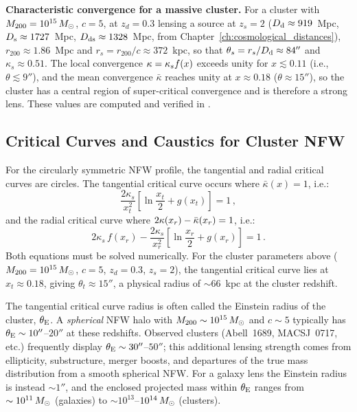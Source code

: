 \begin{example}
\textbf{Characteristic convergence for a massive cluster.}
For a cluster with $M_{200} = 10^{15}\,M_{\odot}$, $c = 5$, at
$z_d = 0.3$ lensing a source at $z_s = 2$
($D_{\mathrm{d}} \approx 919$~Mpc, $D_{\mathrm{s}} \approx 1727$~Mpc,
$D_{\mathrm{ds}} \approx 1328$~Mpc, from Chapter~\ref{ch:cosmological_distances}),
$r_{200} \approx 1.86$~Mpc and $r_s = r_{200}/c \approx 372$~kpc, so
that $\theta_s = r_s / D_{\mathrm{d}} \approx 84''$ and $\kappa_s \approx 0.51$.
The local convergence $\kappa = \kappa_s f(x)$ exceeds unity for
$x \lesssim 0.11$ (i.e., $\theta \lesssim 9''$), and the mean convergence
$\bar\kappa$ reaches unity at $x \approx 0.18$ ($\theta \approx 15''$), so the
cluster has a central region of super-critical convergence and is
therefore a strong lens.
These values are computed and verified in
.
\end{example}

\subsection{Critical Curves and Caustics for Cluster NFW}
\label{sec:cluster_crit}

For the circularly symmetric NFW profile, the tangential and radial
critical curves are circles.  The tangential critical curve occurs
where $\bar{\kappa}(x) = 1$, i.e.:
\begin{equation}
    \frac{2\kappa_s}{x_t^2}\left[\ln\frac{x_t}{2} + g(x_t)\right] = 1 \,,
    \label{eq:cl_tangential_crit}
\end{equation}
and the radial critical curve where
$2\kappa(x_r) - \bar{\kappa}(x_r) = 1$, i.e.:
\begin{equation}
    2\kappa_s\, f(x_r)
    - \frac{2\kappa_s}{x_r^2}\left[\ln\frac{x_r}{2} + g(x_r)\right] = 1 \,.
    \label{eq:cl_radial_crit}
\end{equation}
Both equations must be solved numerically.  For the cluster parameters
above ($M_{200} = 10^{15}\,M_{\odot}$, $c = 5$, $z_d = 0.3$, $z_s = 2$),
the tangential critical curve lies at $x_t \approx 0.18$, giving
$\theta_t \approx 15''$, a physical radius of $\sim 66$~kpc at the
cluster redshift.

\begin{remark}
The tangential critical curve radius is often called the
Einstein radius of the cluster, $\theta_{\mathrm{E}}$.  A \emph{spherical}
NFW halo with $M_{200} \sim 10^{15}\,M_{\odot}$ and $c \sim 5$ typically has
$\theta_{\mathrm{E}} \sim 10''$--$20''$ at these redshifts.  Observed clusters
(Abell~1689, MACSJ~0717, etc.) frequently display $\theta_{\mathrm{E}} \sim
30''$--$50''$; this additional lensing strength comes from
ellipticity, substructure, merger boosts, and departures of the true
mass distribution from a smooth spherical NFW.  For a galaxy lens the
Einstein radius is instead $\sim 1''$, and the enclosed projected
mass within $\theta_{\mathrm{E}}$ ranges from $\sim 10^{11}\,M_{\odot}$ (galaxies) to
$\sim 10^{13}$--$10^{14}\,M_{\odot}$ (clusters).
\end{remark}

